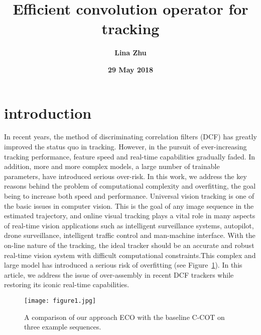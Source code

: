 \documentclass[a4paper,18pt]{article}
\begin{document}
	
	\twocolumn
% 

%
 \title{\textbf{\bfseries \LARGE Efficient convolution operator for tracking} }
\author{\textbf{Lina Zhu}}
\date{\textbf{29 May 2018}}
\maketitle
\section{introduction}
In recent years, the method of discriminating correlation filters (DCF) has greatly improved the status quo in tracking. However, in the pursuit of ever-increasing tracking performance, feature speed and real-time capabilities gradually faded. In addition, more and more complex models, a large number of trainable parameters, have introduced serious over-risk. In this work, we address the key reasons behind the problem of computational complexity and overfitting, the goal being to increase both speed and performance. Universal vision tracking is one of the basic issues in computer vision. This is the goal of any image sequence in the estimated trajectory, and online visual tracking plays a vital role in many aspects of real-time vision applications such as intelligent surveillance systems, autopilot, drone surveillance, intelligent traffic control and man-machine interface. With the on-line nature of the tracking, the ideal tracker should be an accurate and robust real-time vision system with difficult computational constraints.This complex and large model has introduced a serious risk of overfitting (see Figure~\ref{pic1}). In this article, we address the issue of over-assembly in recent DCF trackers while restoring its iconic real-time capabilities.
	\begin{figure}[htp]
	\centering
	\texttt{[image: figure1.jpg]}
	\caption{  A comparison of our approach ECO with the baseline	C-COT \cite{Danelljan_2016_Beyond} on three example sequences.  }\label{pic1}
\end{figure}
\end{document}
